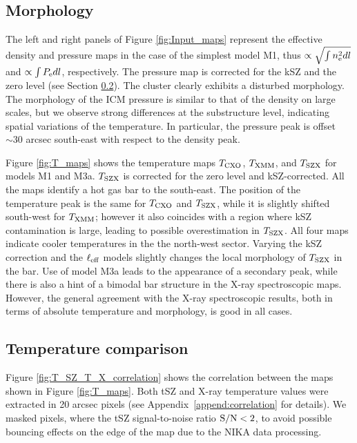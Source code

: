 \documentclass[twocolumn,traditabstract]{aa}
\def\xe {n_{\rm e}}
\def\pe {P_{\rm e}}
\def\TSZ {T_{\rm SZX}}
\def \TXC {T_{\rm CXO}}
\def \TXX {T_{\rm XMM}}
\begin{document}
\subsection{Morphology}
The left and right panels of Figure \ref{fig:Input_maps} represent the effective density and pressure maps in the case of the simplest model M1, thus $\propto \sqrt{\int\xe^2 dl}$ and $\propto \int \pe dl$, respectively. The pressure map is corrected for the kSZ and the zero level (see Section \ref{sec:compT}). The cluster clearly exhibits a disturbed morphology. The morphology of the ICM pressure is similar to that of the density on large scales, but we observe strong differences at the substructure level, indicating spatial variations of the temperature. In particular, the pressure peak is offset $\sim 30$ arcsec south-east with respect to the density peak.

Figure \ref{fig:T_maps} shows the temperature maps ${T}_{\rm CXO}$, ${T}_{\rm XMM}$, and $\TSZ$ for models M1 and M3a. $\TSZ$ is corrected for the zero level and kSZ-corrected. All the maps identify a hot gas bar to the south-east. The position of the temperature peak is the same for $\TXC$ and $\TSZ$, while it is slightly shifted south-west for $\TXX$; however it also coincides with a region where kSZ contamination is large, leading to possible overestimation in $\TSZ$. All four maps indicate cooler temperatures in the the north-west sector. Varying the kSZ correction and the $\ell_{\rm eff}$ models slightly changes the local morphology of $\TSZ$ in the bar. Use of model M3a leads to the appearance of a secondary peak, while there is also a hint of a bimodal bar structure in the X-ray spectroscopic maps. However, the general agreement with the X-ray spectroscopic results, both in terms of absolute temperature and morphology, is good in all cases. 

\subsection{Temperature comparison}\label{sec:compT}
Figure \ref{fig:T_SZ_T_X_correlation} shows the correlation between the maps shown in Figure \ref{fig:T_maps}. Both tSZ and X-ray temperature values were extracted in 20 arcsec pixels (see Appendix~\ref{append:correlation} for details). We masked pixels, where the tSZ signal-to-noise ratio ${\rm S/N} < 2$, to avoid possible bouncing effects on the edge of the map due to the NIKA data processing.
\end{document}
